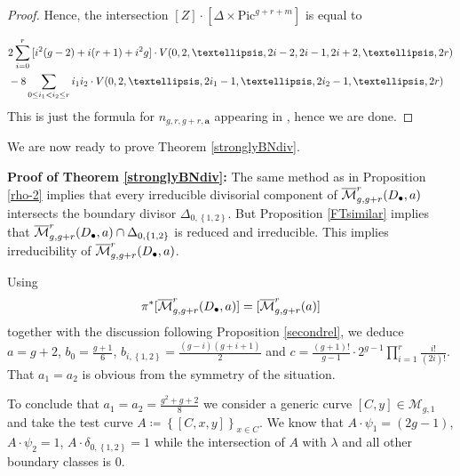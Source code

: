 \documentclass{article}
\theoremstyle{plain}
\theoremstyle{definition}
\def\cM{\mathcal{M}}
\def\mm{\overline{\mathcal{M}}}
\begin{document}
\begin{proof}
Hence, the intersection $[Z] \cdot [\Delta\times \mathrm{Pic}^{g+r+m}]$ is equal to 

\begin{align*}
	&2\sum_{i=0}^r\text{\Large [}i^2(g-2) +i(r+1) +i^2g\text{\Large ]}\cdot V(0,2,\ldots, 2i-2, 2i-1, 2i+2,\ldots, 2r) \\
	& - 8\sum_{0\leq i_1<i_2\leq r}i_1i_2\cdot V(0,2,\ldots, 2i_1-1, \ldots, 2i_2-1,\ldots, 2r)
\end{align*} 
This is just the formula for $n_{g,r,g+r,\textbf{a}}$ appearing in \cite[Equality (5)]{FarkasCastel}, hence we are done.
\end{proof}

We are now ready to prove Theorem \ref{stronglyBNdiv}. 

\textbf{Proof of Theorem \ref{stronglyBNdiv}:} The same method as in Proposition \ref{rho-2} implies that every irreducible divisorial component of $\mm^r_{g, g+r}\text{\large (}D_{\bullet}, \textbf{a}\text{\large )}$ intersects the boundary divisor $\Delta_{0,\left\{1,2\right\}}$. But Proposition \ref{FTsimilar} implies that $\mm^r_{g, g+r}\text{\large (}D_{\bullet}, \textbf{a}\text{\large )}\cap\Delta_{0,\left\{1,2\right\}}$ is reduced and irreducible. This implies irreducibility of  $\mm^r_{g, g+r}\text{\large (}D_{\bullet}, \textbf{a}\text{\large )}$. 

Using 	
\[\pi^*[\mm^r_{g, g+r}\text{\large (}D_{\bullet}, \textbf{a}\text{\large )}] = [\mm^r_{g,g+r}(\textbf{a})]\]
together with the discussion following Proposition \ref{secondrel}, we deduce $a = g+2$, $b_0 = \frac{g+1}{6}$, $b_{i,\left\{1,2\right\}} = \frac{(g-i)(g+i+1)}{2}$ and $c = \frac{(g+1)!}{g-1}\cdot 2^{g-1}\prod_{i=1}^{r}\frac{i!}{(2i)!}$. That $a_1 = a_2$ is obvious from the symmetry of the situation. 

To conclude that $ a_1 = a_2 = \frac{g^2+g+2}{8}$ we consider a generic curve $[C,y] \in \cM_{g,1}$ and take the test curve $A \coloneqq \left\{[C,x,y] \right\}_{x\in C}$. We know that $A\cdot \psi_1 = (2g-1)$, $A\cdot \psi_2 = 1$, $A\cdot \delta_{0,\left\{1,2\right\}} = 1$ while the intersection of $A$ with $\lambda$ and all other boundary classes is $0$. 
\end{document}
